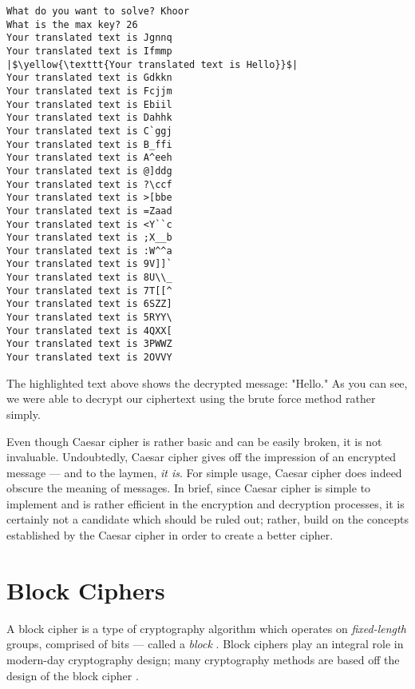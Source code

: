 \begin{verbatim}
What do you want to solve? Khoor
What is the max key? 26
Your translated text is Jgnnq
Your translated text is Ifmmp
|$\yellow{\texttt{Your translated text is Hello}}$|
Your translated text is Gdkkn
Your translated text is Fcjjm
Your translated text is Ebiil
Your translated text is Dahhk
Your translated text is C`ggj
Your translated text is B_ffi
Your translated text is A^eeh
Your translated text is @]ddg
Your translated text is ?\ccf
Your translated text is >[bbe
Your translated text is =Zaad
Your translated text is <Y``c
Your translated text is ;X__b
Your translated text is :W^^a
Your translated text is 9V]]`
Your translated text is 8U\\_
Your translated text is 7T[[^
Your translated text is 6SZZ]
Your translated text is 5RYY\
Your translated text is 4QXX[
Your translated text is 3PWWZ
Your translated text is 2OVVY
\end{verbatim}
\begingroup
\endgroup

The highlighted text above shows the decrypted message: "Hello." As you can see, we were able to decrypt our ciphertext
using the brute force method rather simply. 

Even though Caesar cipher is rather basic and can be easily broken, it is not invaluable. Undoubtedly, Caesar cipher gives
off the impression of an encrypted message --- and to the laymen, \textit{it is}. For simple usage, Caesar cipher does indeed
obscure the meaning of messages. In brief, since Caesar cipher is simple to implement and is rather efficient in the
encryption and decryption processes, it is certainly not a candidate which should be ruled out; rather, build on the 
concepts established by the Caesar cipher in order to create a better cipher.

\section{Block Ciphers}

A block cipher is a type of cryptography algorithm which operates on \textit{fixed-length} groups, comprised of bits --- called a \textit{block} \cite{wiki:block_cipher}.
Block ciphers play an integral role in modern-day cryptography design; many cryptography methods are based off the design of the block cipher \cite{wiki:block_cipher}.

